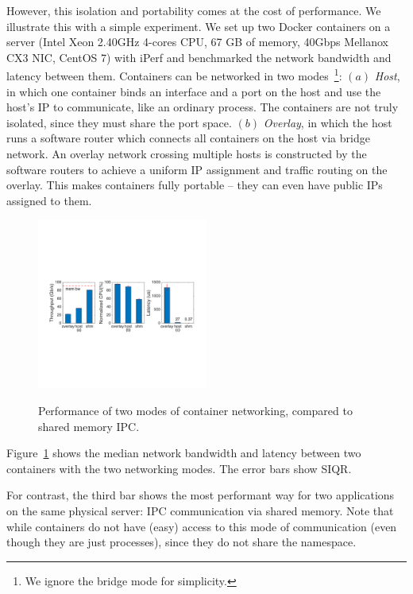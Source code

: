 However, this isolation and portability comes at the cost of performance. We
illustrate this with a simple experiment.  We set up two Docker containers on a
server (Intel Xeon 2.40GHz 4-cores CPU, 67 GB of memory, 40Gbps Mellanox CX3
NIC, CentOS 7) with iPerf and benchmarked the network bandwidth and latency
between them.  Containers can be networked in two modes~\footnote{We ignore the
bridge mode for simplicity.}: $(a)$ {\em Host}, in which one container binds an
interface and a port on the host and use the host's IP to communicate, like an
ordinary process. The containers are not truly isolated, since they must share
the port space.  $(b)$ {\em Overlay}, in which the host runs a software router
which connects all containers on the host via bridge network. An overlay network
crossing multiple hosts is constructed by the software routers to achieve a
uniform IP assignment and traffic routing on the overlay. This makes containers
fully portable -- they can even have public IPs assigned to them.

\begin{figure}[ht]
     \centering 
     \includegraphics[width=0.5\textwidth]{figures/intro/intro_exist2.pdf} 
     \label{fig:three_modes}
     \caption{Performance of two modes of container networking, compared to
     shared memory IPC.} 
\end{figure} 

Figure~\ref{fig:three_modes} shows the median network bandwidth and latency
between two containers with the two networking modes. The error bars show SIQR.

For contrast, the third bar shows the most performant way for two applications
on the same physical server: IPC communication via shared memory.  Note that
while containers do not have (easy) access to this mode of communication (even
though they are just processes), since they do not share the namespace.

